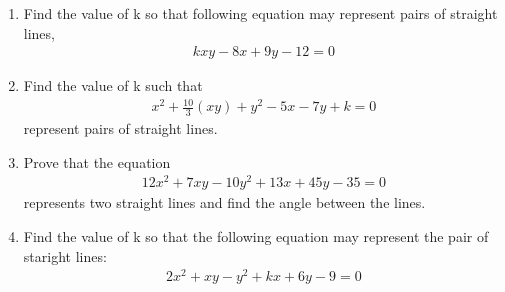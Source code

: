 \begin{enumerate}[label=\thesection.\arabic*.,ref=\thesection.\theenumi]
\item Find the value of k so that following equation may represent pairs of straight lines,
\begin{align}
kxy-8x+9y-12 = 0
\label{eq:solutions/13/10/Q_eq}
\end{align}
\solution


\item Find the value of k such that 
\begin{align}
x^{2}+ \frac{10}{3}(xy)+y^2 -5x -7y + k =0 \label{eq:solutions/13/11eq5}
\end{align}
 represent pairs of straight lines.
\\
\solution

\item Prove that the equation
\begin{align}
	12x^2 + 7xy -10y^2 +13x +45y -35 =0 
\end{align}
represents two straight lines and find the angle between the lines.
\\
\solution


\item Find the value of k so that the following equation may represent the pair of staright lines:
\begin{align}
	2x^2+ xy -y^2 + kx + 6y - 9 = 0 \label{eq:solutions/13/13/1} 
\end{align}

\solution


\end{enumerate}


